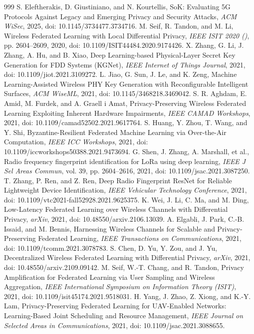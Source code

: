 \documentclass[10.5pt,compsoc,winfonts]{ICN}
\begin{document}
\begin{thebibliography}{999}
S. Eleftherakis, D. Giustiniano, and N. Kourtellis, SoK: Evaluating 5G Protocols Against Legacy and Emerging Privacy and Security Attacks, \emph{ACM WiSec}, 2025, doi: 10.1145/3734477.3734716.
M. Seif, R. Tandon, and M. Li, Wireless Federated Learning with Local Differential Privacy, \emph{IEEE ISIT 2020 ()}, pp. 2604–2609, 2020, doi: 10.1109/ISIT44484.2020.9174426.
X. Zhang, G. Li, J. Zhang, A. Hu, and B. Xiao, Deep Learning-based Physical-Layer Secret Key Generation for FDD Systems (KGNet), \emph{IEEE Internet of Things Journal}, 2021, doi: 10.1109/jiot.2021.3109272.
L. Jiao, G. Sun, J. Le, and K. Zeng, Machine Learning-Assisted Wireless PHY Key Generation with Reconfigurable Intelligent Surfaces, \emph{ACM WiseML}, 2021, doi: 10.1145/3468218.3469042.
S. R. Aghdam, E. Amid, M. Furdek, and A. Graell i Amat, Privacy-Preserving Wireless Federated Learning Exploiting Inherent Hardware Impairments, \emph{IEEE CAMAD Workshops}, 2021, doi: 10.1109/camad52502.2021.9617764.
S. Huang, Y. Zhou, T. Wang, and Y. Shi, Byzantine-Resilient Federated Machine Learning via Over-the-Air Computation, \emph{IEEE ICC Workshops}, 2021, doi: 10.1109/iccworkshops50388.2021.9473694.
G. Shen, J. Zhang, A. Marshall, et al., Radio frequency fingerprint identification for LoRa using deep learning, \emph{IEEE J Sel Areas Commun}, vol. 39, pp. 2604–2616, 2021, doi: 10.1109/jsac.2021.3087250.
T. Zhang, P. Ren, and Z. Ren, Deep Radio Fingerprint ResNet for Reliable Lightweight Device Identification, \emph{IEEE Vehicular Technology Conference}, 2021, doi: 10.1109/vtc2021-fall52928.2021.9625375.
K. Wei, J. Li, C. Ma, and M. Ding, Low-Latency Federated Learning over Wireless Channels with Differential Privacy, \emph{arXiv}, 2021, doi: 10.48550/arxiv.2106.13039.
A. Elgabli, J. Park, C.-B. Issaid, and M. Bennis, Harnessing Wireless Channels for Scalable and Privacy-Preserving Federated Learning, \emph{IEEE Transactions on Communications}, 2021, doi: 10.1109/tcomm.2021.3078783.
S. Chen, D. Yu, Y. Zou, and J. Yu, Decentralized Wireless Federated Learning with Differential Privacy, \emph{arXiv}, 2021, doi: 10.48550/arxiv.2109.09142.
M. Seif, W.-T. Chang, and R. Tandon, Privacy Amplification for Federated Learning via User Sampling and Wireless Aggregation, \emph{IEEE International Symposium on Information Theory (ISIT)}, 2021, doi: 10.1109/isit45174.2021.9518031.
H. Yang, J. Zhao, Z. Xiong, and K.-Y. Lam, Privacy-Preserving Federated Learning for UAV-Enabled Networks: Learning-Based Joint Scheduling and Resource Management, \emph{IEEE Journal on Selected Areas in Communications}, 2021, doi: 10.1109/jsac.2021.3088655.

\end{thebibliography}
\end{document}

